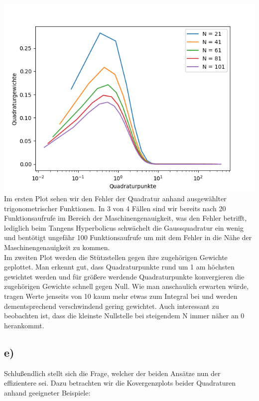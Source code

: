 \includegraphics[width=\linewidth]{Aufgabe_1/punkte-gewichte.png}
Im ersten Plot sehen wir den Fehler der Quadratur anhand ausgewählter trigonometrischer Funktionen. In 3 von 4 Fällen sind wir bereits nach 20 Funktionsaufrufe im Bereich der Maschinengenauigkeit, was den Fehler betrifft, lediglich beim Tangens Hyperbolicus schwächelt die Gaussquadratur ein wenig und bentötigt ungefähr 100 Funktionsaufrufe um mit dem Fehler in die Nähe der Maschinengenauigkeit zu kommen.\\
Im zweiten Plot werden die Stützstellen gegen ihre zugehörigen Gewichte geplottet. Man erkennt gut, dass Quadraturpunkte rund um 1 am höchsten gewichtet werden und für größere werdende Quadraturpunkte konvergieren die zugehörigen Gewichte schnell gegen Null. Wie man anschaulich erwarten würde, tragen Werte jenseits von 10 kaum mehr etwas zum Integral bei und werden dementsprechend verschwindend gering gewichtet. Auch interessant zu beobachten ist, dass die kleinste Nullstelle bei steigendem N immer näher an 0 herankommt.
\subsection*{e)}
Schlußendlich stellt sich die Frage, welcher der beiden Ansätze nun der effizientere sei. Dazu betrachten wir die Kovergenzplots beider Quadraturen anhand geeigneter Beispiele:

